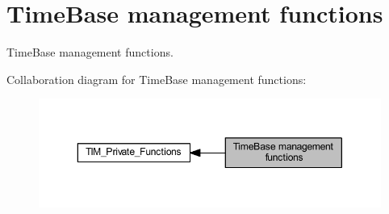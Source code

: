 \hypertarget{group___t_i_m___group1}{}\section{Time\+Base management functions}
\label{group___t_i_m___group1}


Time\+Base management functions.  


Collaboration diagram for Time\+Base management functions\+:
\nopagebreak
\begin{figure}[H]
\begin{center}
\leavevmode
\includegraphics[width=350pt]{group___t_i_m___group1}
\end{center}
\end{figure}
